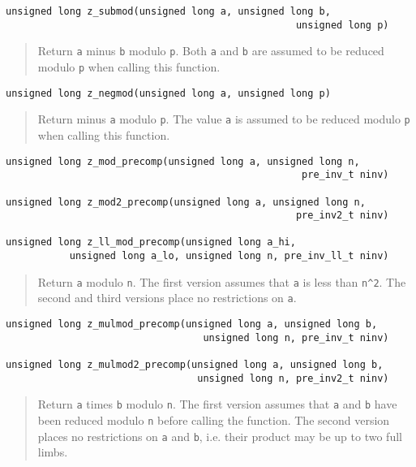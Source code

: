 \documentclass[a4paper,10pt]{article}
\newcommand{\code}{\lstinline}
\begin{document}
\begin{lstlisting}
unsigned long z_submod(unsigned long a, unsigned long b, 
                                                  unsigned long p)
\end{lstlisting}
\begin{quote}
Return \code{a} minus \code{b} modulo \code{p}. Both \code{a} and \code{b} are assumed to be reduced modulo \code{p} when calling this function. 
\end{quote}

\begin{lstlisting}
unsigned long z_negmod(unsigned long a, unsigned long p)
\end{lstlisting}
\begin{quote}
Return minus \code{a} modulo \code{p}. The value \code{a} is assumed to be reduced modulo \code{p} when calling this function. 
\end{quote}

\begin{lstlisting}
unsigned long z_mod_precomp(unsigned long a, unsigned long n, 
                                                   pre_inv_t ninv)

unsigned long z_mod2_precomp(unsigned long a, unsigned long n, 
                                                  pre_inv2_t ninv)

unsigned long z_ll_mod_precomp(unsigned long a_hi,
           unsigned long a_lo, unsigned long n, pre_inv_ll_t ninv)
\end{lstlisting}
\begin{quote}
Return \code{a} modulo \code{n}. The first version assumes that \code{a} is less than \code{n^2}. The second and third versions place no restrictions on \code{a}.
\end{quote}

\begin{lstlisting}
unsigned long z_mulmod_precomp(unsigned long a, unsigned long b, 
                                  unsigned long n, pre_inv_t ninv)
                                         
unsigned long z_mulmod2_precomp(unsigned long a, unsigned long b, 
                                 unsigned long n, pre_inv2_t ninv)
\end{lstlisting}
\begin{quote}
Return \code{a} times \code{b} modulo \code{n}. The first version assumes that \code{a} and \code{b} have been reduced modulo \code{n} before calling the function. The second version places no restrictions on \code{a} and \code{b}, i.e. their product may be up to two full limbs.
\end{quote}
      
\end{document}

